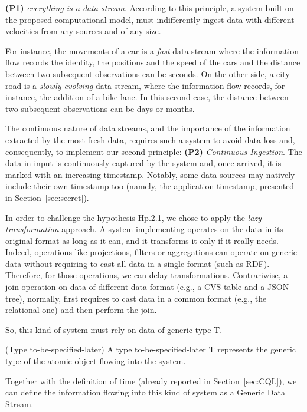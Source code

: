\textbf{(P1)} \textit{everything is a data stream}. According to this principle, a system built on the proposed computational model, must indifferently ingest data with different velocities from any sources and of any size. 

For instance, the movements of a car is a \textit{fast} data stream where the information flow records the identity, the positions and the speed of the cars and the distance between two subsequent observations can be seconds. On the other side, a city road is a \textit{slowly evolving} data stream, where the information flow records, for instance, the addition of a bike lane.
In this second case, the distance between two subsequent observations can be days or months. 

The continuous nature of data streams, and the importance of the information extracted by the most fresh data, requires such a system to avoid data loss and, consequently, to implement our second principle: \textbf{(P2)} \textit{Continuous Ingestion}. The data in input is continuously captured by the system and, once arrived, it is marked with an increasing timestamp. Notably, some data sources may natively include their own timestamp too (namely, the application timestamp, presented in Section~\ref{sec:secret}). 

In order to challenge the hypothesis \textsf{Hp.2.1}, we chose to apply the \textit{lazy transformation} approach. 
A system implementing \river{} operates on the data in its original format as long as it can, and it transforms it only if it really needs. Indeed, operations like projections, filters or aggregations can operate on generic data without requiring to cast all data in a single format (such as RDF). Therefore, for those operations, we can delay transformations. Contrariwise, a join operation on data of different data format (e.g., a CVS table and a JSON tree), normally, first requires to cast data in a common format (e.g., the relational one) and then perform the join. 

So, this kind of system must rely on data of generic type $\mathrm{T}$.

\begin{Definition}
(Type to-be-specified-later) A type to-be-specified-later $\mathrm{T}$ represents the generic type of the atomic object flowing into the system.
\end{Definition}

Together with the definition of time (already reported in Section~\ref{sec:CQL}), we can define the information flowing into this kind of system as a Generic Data Stream.

